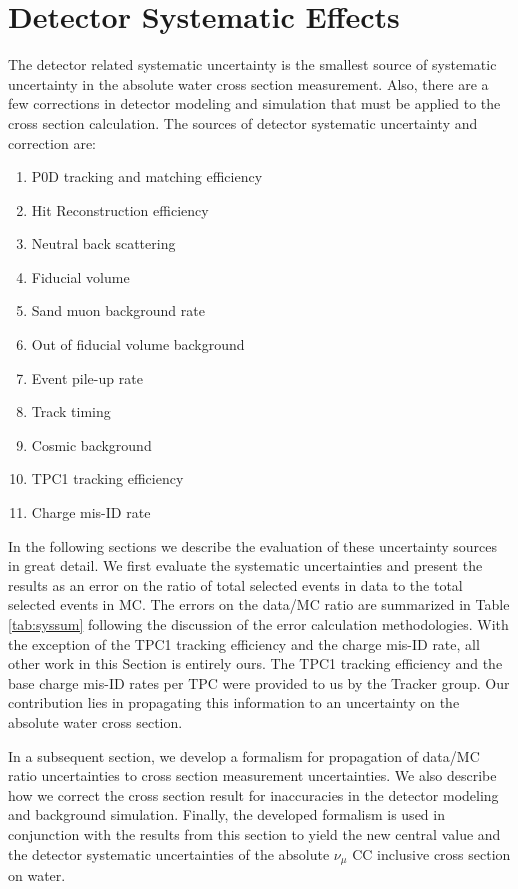 \section{Detector Systematic Effects}
\label{sec:detsys}

The detector related systematic uncertainty is the smallest source of systematic uncertainty in the absolute water cross section measurement. Also, there are a few corrections in detector modeling and simulation that must be applied to the cross section calculation. The sources of detector systematic uncertainty and correction are: 

\begin{enumerate}
\item P0D tracking and matching efficiency
\item Hit Reconstruction efficiency
\item Neutral back scattering
\item Fiducial volume
\item Sand muon background rate
\item Out of fiducial volume background
\item Event pile-up rate
\item Track timing
\item Cosmic background
\item TPC1 tracking efficiency
\item Charge mis-ID rate
\end{enumerate}

In the following sections we describe the evaluation of these uncertainty sources in great detail. We first evaluate the systematic uncertainties and present the results as an error on the ratio of total selected events in data to the total selected events in MC. The errors on the data/MC ratio are summarized in Table \ref{tab:syssum} following the discussion of the error calculation methodologies. With the exception of the TPC1 tracking efficiency and the charge mis-ID rate, all other work in this Section is entirely ours. The TPC1 tracking efficiency and the base charge mis-ID rates per TPC were provided to us by the Tracker group. Our contribution lies in propagating this information to an uncertainty on the absolute water cross section. 

In a subsequent section, we develop a formalism for propagation of data/MC ratio uncertainties to cross section measurement uncertainties. We also describe how we correct the cross section result for inaccuracies in the detector modeling and background simulation. Finally, the developed formalism is used in conjunction with the results from this section to yield the new central value and the detector systematic uncertainties of the absolute $\nu_\mu$ CC inclusive cross section on water.

